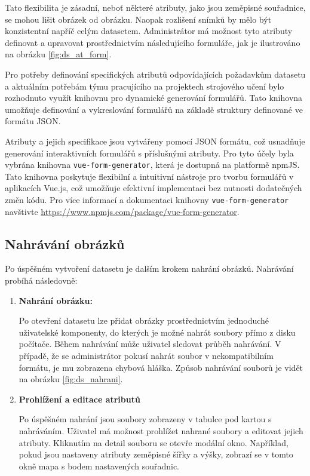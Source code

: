 Tato flexibilita je zásadní, neboť některé atributy, jako jsou zeměpisné souřadnice, se mohou lišit obrázek od obrázku. Naopak rozlišení snímků by mělo být konzistentní napříč celým datasetem. Administrátor má možnost tyto atributy definovat a upravovat prostřednictvím následujícího formuláře, jak je ilustrováno na obrázku \vref{fig:ds_at_form}. 

Pro potřeby definování specifických atributů odpovídajících požadavkům datasetu a aktuálním potřebám týmu pracujícího na projektech strojového učení bylo rozhodnuto využít knihovnu pro dynamické generování formulářů. Tato knihovna umožňuje definování a vykreslování formulářů na základě struktury definované ve formátu JSON.

Atributy a jejich specifikace jsou vytvářeny pomocí JSON formátu, což usnadňuje generování interaktivních formulářů s příslušnými atributy. Pro tyto účely byla vybrána knihovna \texttt{vue-form-generator}, která je dostupná na platformě npmJS. Tato knihovna poskytuje flexibilní a intuitivní nástroje pro tvorbu formulářů v aplikacích Vue.js, což umožňuje efektivní implementaci bez nutnosti dodatečných změn kódu. Pro více informací a dokumentaci knihovny \texttt{vue-form-generator} navštivte \url{https://www.npmjs.com/package/vue-form-generator}.


\subsection{Nahrávání obrázků}
Po úspěšném vytvoření datasetu je dalším krokem nahrání obrázků. Nahrávání probíhá následovně:

\begin{enumerate}
    \item \textbf{Nahrání obrázku:}

    Po otevření datasetu lze přidat obrázky prostřednictvím jednoduché uživatelské komponenty, do kterých je možné nahrát soubory přímo z disku počítače. Během nahrávání může uživatel sledovat průběh nahrávání. V případě, že se administrátor pokusí nahrát soubor v nekompatibilním formátu, je mu zobrazena chybová hláška. Způsob nahrávání souborů je vidět na obrázku \vref{fig:ds_nahrani}.


    \item  \textbf{Prohlížení a editace atributů}

    Po úspěšném nahrání jsou soubory zobrazeny v tabulce pod kartou s nahráváním. Uživatel má možnost prohlížet nahrané soubory a editovat jejich atributy. Kliknutím na detail souboru se otevře modální okno. Například, pokud jsou nastaveny atributy zeměpisné šířky a výšky, zobrazí se v tomto okně mapa s bodem nastavených souřadnic.
\end{enumerate}

